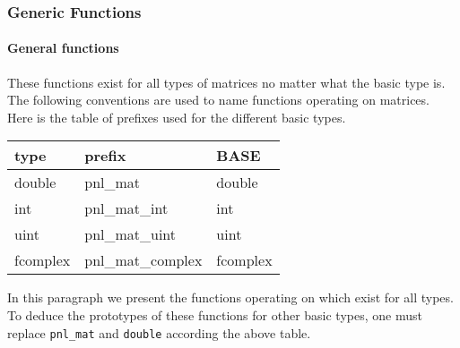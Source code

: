 \subsubsection{Generic Functions}
\paragraph{General functions}
These functions exist for all types of matrices no matter what the basic type
is. The following conventions are used to name functions operating on matrices.
Here is the table of prefixes used for the different basic types.

\begin{center}
  \begin{tabular}[t]{lll}
    type & prefix & BASE\\
    \hline
    double & pnl_mat & double \\
    \hline
    int & pnl_mat_int & int \\
    \hline
    uint & pnl_mat_uint & uint\\
    \hline
    fcomplex & pnl_mat_complex & fcomplex
  \end{tabular}
\end{center}

In this paragraph we present the functions operating on 
which exist for all types. To deduce the prototypes of these functions for
other basic types, one must replace {\tt pnl_mat} and {\tt double} according
the above table.

